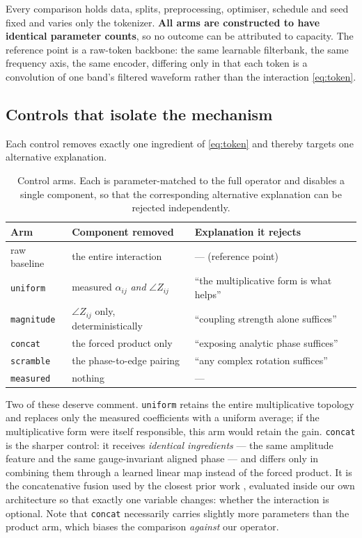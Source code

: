 \documentclass{article}
\begin{document}
Every comparison holds data, splits, preprocessing, optimiser, schedule and seed
fixed and varies only the tokenizer. \textbf{All arms are constructed to have
identical parameter counts}, so no outcome can be attributed to capacity. The
reference point is a raw-token backbone: the same learnable filterbank, the same
frequency axis, the same encoder, differing only in that each token is a
convolution of one band's filtered waveform rather than the interaction
\eqref{eq:token}.

\subsection{Controls that isolate the mechanism}
\label{sec:controls}

Each control removes exactly one ingredient of \eqref{eq:token} and thereby
targets one alternative explanation.

\begin{table}[t]
\caption{Control arms. Each is parameter-matched to the full operator and
disables a single component, so that the corresponding alternative explanation
can be rejected independently.}
\label{tab:controls}
\begin{center}
\begin{tabular}{lll}
\toprule
Arm & Component removed & Explanation it rejects \\
\midrule
raw baseline & the entire interaction & --- (reference point) \\
\texttt{uniform} & measured $\alpha_{ij}$ \emph{and} $\angle Z_{ij}$ & ``the multiplicative form is what helps'' \\
\texttt{magnitude} & $\angle Z_{ij}$ only, deterministically & ``coupling strength alone suffices'' \\
\texttt{concat} & the forced product only & ``exposing analytic phase suffices'' \\
\texttt{scramble} & the phase-to-edge pairing & ``any complex rotation suffices'' \\
\midrule
\texttt{measured} & nothing & --- \\
\bottomrule
\end{tabular}
\end{center}
\end{table}

Two of these deserve comment. \texttt{uniform} retains the entire multiplicative
topology and replaces only the measured coefficients with a uniform average; if
the multiplicative form were itself responsible, this arm would retain the gain.
\texttt{concat} is the sharper control: it receives \emph{identical ingredients}
--- the same amplitude feature and the same gauge-invariant aligned phase --- and
differs only in combining them through a learned linear map instead of the forced
product. It is the concatenative fusion used by the closest prior work
\citep{lee2026sleeppacnet}, evaluated inside our own architecture so that
exactly one variable changes: whether the interaction is optional. Note that
\texttt{concat} necessarily carries slightly more parameters than the product
arm, which biases the comparison \emph{against} our operator.
\end{document}
